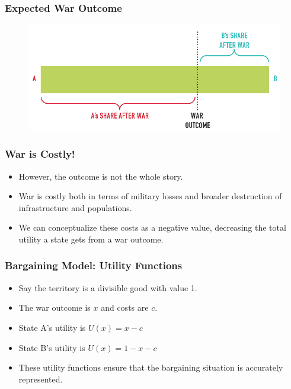 \documentclass[handout]{beamer}
\begin{document}
\begin{frame} 
\frametitle{\LARGE{Expected War Outcome}}
\begin{figure}[ht!]
	\centering
	\includegraphics[width=\textwidth,height=0.8\textheight,keepaspectratio]{./barg2.png}
\end{figure}
\end{frame}

\begin{frame} 
	\frametitle{\LARGE{War is Costly!}}
	\begin{itemize}
		\item However, the outcome is not the whole story. \pause
		\item War is costly both in terms of military losses and broader destruction of infrastructure and populations. \pause
		\item We can conceptualize these costs as a negative value, decreasing the total utility a state gets from a war outcome.
	\end{itemize}
\end{frame}

\begin{frame} 
	\frametitle{\LARGE{Bargaining Model: Utility Functions}}
	\begin{itemize}
		\item Say the territory is a divisible good with value 1. \pause
		\item The war outcome is $x$ and costs are $c$. \pause
		\item State A's utility is $U(x) = x -c$ \pause
		\item State B's utility is $U(x) = 1 - x -c$ \pause
		\item These utility functions ensure that the bargaining situation is accurately represented.
	\end{itemize}
\end{frame}
\end{document}
